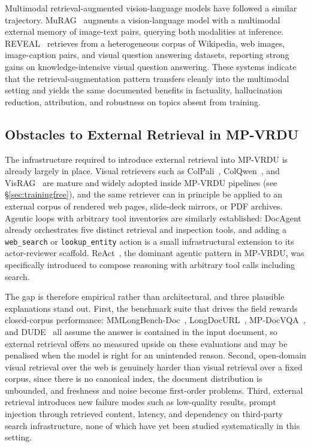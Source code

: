 \documentclass[11pt]{article}
\begin{document}
Multimodal retrieval-augmented vision-language models have followed a similar trajectory. MuRAG~\cite{chen2022murag} augments a vision-language model with a multimodal external memory of image-text pairs, querying both modalities at inference. REVEAL~\cite{hu2023reveal} retrieves from a heterogeneous corpus of Wikipedia, web images, image-caption pairs, and visual question answering datasets, reporting strong gains on knowledge-intensive visual question answering. These systems indicate that the retrieval-augmentation pattern transfers cleanly into the multimodal setting and yields the same documented benefits in factuality, hallucination reduction, attribution, and robustness on topics absent from training.

\subsection{Obstacles to External Retrieval in MP-VRDU}
The infrastructure required to introduce external retrieval into MP-VRDU is already largely in place. Visual retrievers such as ColPali~\cite{faysse2024colpali}, ColQwen~\cite{faysse2025colqwen}, and VisRAG~\cite{yu2024visrag} are mature and widely adopted inside MP-VRDU pipelines (see \S\ref{sec:trainingfree}), and the same retriever can in principle be applied to an external corpus of rendered web pages, slide-deck mirrors, or PDF archives. Agentic loops with arbitrary tool inventories are similarly established: DocAgent~\cite{sun2025docagent} already orchestrates five distinct retrieval and inspection tools, and adding a \texttt{web\_search} or \texttt{lookup\_entity} action is a small infrastructural extension to its actor-reviewer scaffold. ReAct~\cite{yao2022react}, the dominant agentic pattern in MP-VRDU, was specifically introduced to compose reasoning with arbitrary tool calls including search.

The gap is therefore empirical rather than architectural, and three plausible explanations stand out. First, the benchmark suite that drives the field rewards closed-corpus performance: MMLongBench-Doc~\cite{ma2024mmlongbench}, LongDocURL~\cite{deng2025longdocurl}, MP-DocVQA~\cite{tito2023hierarchical}, and DUDE~\cite{van2023document} all assume the answer is contained in the input document, so external retrieval offers no measured upside on these evaluations and may be penalised when the model is right for an unintended reason. Second, open-domain visual retrieval over the web is genuinely harder than visual retrieval over a fixed corpus, since there is no canonical index, the document distribution is unbounded, and freshness and noise become first-order problems. Third, external retrieval introduces new failure modes such as low-quality results, prompt injection through retrieved content, latency, and dependency on third-party search infrastructure, none of which have yet been studied systematically in this setting.
\end{document}
